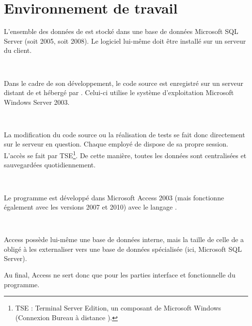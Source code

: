 \chapter{Environnement de travail}
L'ensemble des données de \integrale{} est stocké dans une base de données Microsoft SQL Server (soit 2005, soit 2008). Le logiciel lui-même doit être installé sur un serveur du client.

~

Dans le cadre de son développement, le code source est enregistré sur un serveur distant de \solulog{} et hébergé par \fidit. Celui-ci utilise le système d'exploitation Microsoft Windows Server 2003.

~

La modification du code source ou la réalisation de tests se fait donc directement sur le serveur en question. Chaque employé de \solulog{} dispose de sa propre session. L'accès se fait par TSE\footnote{TSE : Terminal Server Edition, un composant de Microsoft Windows (\og Connexion Bureau à distance \fg).}. De cette manière, toutes les données sont centralisées et sauvegardées quotidiennement.

~

Le programme \integrale{} est développé dans Microsoft Access 2003 (mais fonctionne également avec les versions 2007 et 2010) avec le langage \vb.

~

Access possède lui-même une base de données interne, mais la taille de celle de \integrale{} a obligé \solulog{} à les externaliser vers une base de données spécialisée (ici, Microsoft SQL Server).

Au final, Access ne sert donc que pour les parties interface et fonctionnelle du programme.
